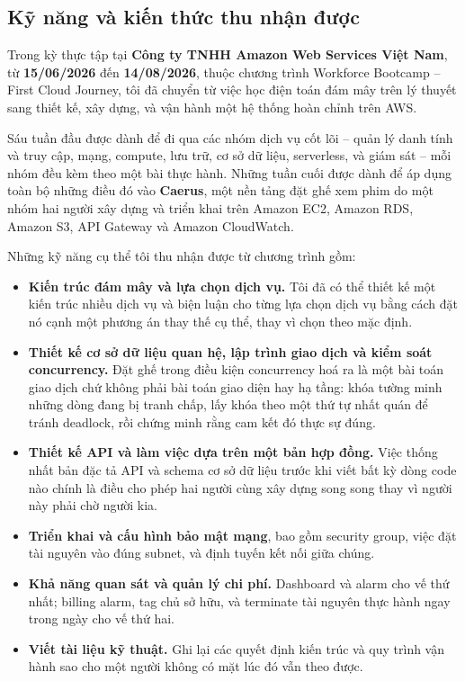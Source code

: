 \subsection{Kỹ năng và kiến thức thu nhận được}

Trong kỳ thực tập tại \textbf{Công ty TNHH Amazon Web Services Việt Nam}, từ
\textbf{15/06/2026} đến \textbf{14/08/2026}, thuộc chương trình Workforce
Bootcamp -- First Cloud Journey, tôi đã chuyển từ việc học điện toán đám mây
trên lý thuyết sang thiết kế, xây dựng, và vận hành một hệ thống hoàn chỉnh
trên AWS.

Sáu tuần đầu được dành để đi qua các nhóm dịch vụ cốt lõi -- quản lý danh tính
và truy cập, mạng, compute, lưu trữ, cơ sở dữ liệu, serverless, và giám sát --
mỗi nhóm đều kèm theo một bài thực hành. Những tuần cuối được dành để áp dụng
toàn bộ những điều đó vào \textbf{Caerus}, một nền tảng đặt ghế xem phim do một
nhóm hai người xây dựng và triển khai trên Amazon EC2, Amazon RDS, Amazon S3,
API Gateway và Amazon CloudWatch.

Những kỹ năng cụ thể tôi thu nhận được từ chương trình gồm:

\begin{itemize}
    \setlength\itemsep{0.2em}
    \item \textbf{Kiến trúc đám mây và lựa chọn dịch vụ.} Tôi đã có thể thiết
    kế một kiến trúc nhiều dịch vụ và biện luận cho từng lựa chọn dịch vụ bằng
    cách đặt nó cạnh một phương án thay thế cụ thể, thay vì chọn theo mặc định.

    \item \textbf{Thiết kế cơ sở dữ liệu quan hệ, lập trình giao dịch và kiểm
    soát concurrency.} Đặt ghế trong điều kiện concurrency hoá ra là một bài
    toán giao dịch chứ không phải bài toán giao diện hay hạ tầng: khóa tường
    minh những dòng đang bị tranh chấp, lấy khóa theo một thứ tự nhất quán để
    tránh deadlock, rồi chứng minh rằng cam kết đó thực sự đúng.

    \item \textbf{Thiết kế API và làm việc dựa trên một bản hợp đồng.} Việc
    thống nhất bản đặc tả API và schema cơ sở dữ liệu trước khi viết bất kỳ dòng
    code nào chính là điều cho phép hai người cùng xây dựng song song thay vì
    người này phải chờ người kia.

    \item \textbf{Triển khai và cấu hình bảo mật mạng}, bao gồm security group,
    việc đặt tài nguyên vào đúng subnet, và định tuyến kết nối giữa chúng.

    \item \textbf{Khả năng quan sát và quản lý chi phí.} Dashboard và alarm cho
    vế thứ nhất; billing alarm, tag chủ sở hữu, và terminate tài nguyên thực
    hành ngay trong ngày cho vế thứ hai.

    \item \textbf{Viết tài liệu kỹ thuật.} Ghi lại các quyết định kiến trúc và
    quy trình vận hành sao cho một người không có mặt lúc đó vẫn theo được.
\end{itemize}

